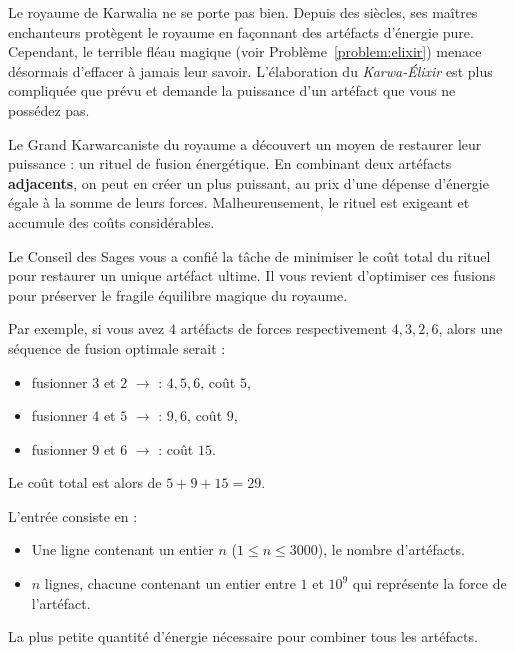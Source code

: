 \problemname{}


Le royaume de Karwalia ne se porte pas bien. Depuis des siècles, ses maîtres enchanteurs protègent le royaume en façonnant des artéfacts d'énergie pure. Cependant, le terrible fléau magique (voir Problème~\ref{problem:elixir}) menace désormais d'effacer à jamais leur savoir. L'élaboration du \emph{Karwa-Élixir} est plus compliquée que prévu et demande la puissance d'un artéfact que vous ne possédez pas.

Le Grand Karwarcaniste du royaume a découvert un moyen de restaurer leur puissance : un rituel de fusion énergétique. En combinant deux artéfacts \textbf{adjacents}, on peut en créer un plus puissant, au prix d'une dépense d'énergie égale à la somme de leurs forces. Malheureusement, le rituel est exigeant et accumule des coûts considérables.

Le Conseil des Sages vous a confié la tâche de minimiser le coût total du rituel pour restaurer un unique artéfact ultime. Il vous revient d'optimiser ces fusions pour préserver le fragile équilibre magique du royaume.

Par exemple, si vous avez $4$ artéfacts de forces respectivement $4, 3, 2, 6$, alors une séquence de fusion optimale serait :
\begin{itemize}
    \item fusionner $3$ et $2$ $\rightarrow$ : $4, 5, 6$, coût $5$,
    \item fusionner $4$ et $5$ $\rightarrow$ : $9, 6$, coût $9$,
    \item fusionner $9$ et $6$ $\rightarrow$ : coût $15$.
\end{itemize}
Le coût total est alors de $5 + 9 + 15 = 29$.

\begin{Input}
    L'entrée consiste en :
    \begin{itemize}
        \item Une ligne contenant un entier $n$ ($1 \leq n \leq 3000$), le nombre d'artéfacts.
        \item $n$ lignes, chacune contenant un entier entre $1$ et $10^{9}$ qui représente la force de l'artéfact.
    \end{itemize}
\end{Input}

\begin{Output}
    La plus petite quantité d'énergie nécessaire pour combiner tous les artéfacts.
\end{Output}
